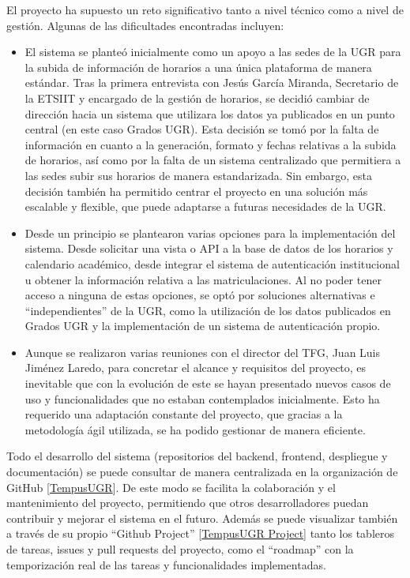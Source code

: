 El proyecto ha supuesto un reto significativo tanto a nivel técnico como a nivel de gestión. Algunas de las dificultades encontradas incluyen:
\begin{itemize}
    \item El sistema se planteó inicialmente como un apoyo a las sedes de la UGR para la subida de información de horarios a una única plataforma de manera estándar. Tras la primera entrevista con Jesús García Miranda, Secretario de la ETSIIT y encargado de la gestión de horarios, se decidió cambiar de dirección hacia un sistema que utilizara los datos ya publicados en un punto central (en este caso Grados UGR).
    Esta decisión se tomó por la falta de información en cuanto a la generación, formato y fechas relativas a la subida de horarios, así como por la falta de un sistema centralizado que permitiera a las sedes subir sus horarios de manera estandarizada.
    Sin embargo, esta decisión también ha permitido centrar el proyecto en una solución más escalable y flexible, que puede adaptarse a futuras necesidades de la UGR.

    \item Desde un principio se plantearon varias opciones para la implementación del sistema. Desde solicitar una vista o API a la base de datos de los horarios y calendario académico, desde integrar el sistema de autenticación institucional u obtener la información relativa a las matriculaciones. Al no poder tener acceso a ninguna de estas opciones, se optó por soluciones alternativas e ``independientes'' de la UGR, como la utilización de los datos publicados en Grados UGR y la implementación de un sistema de autenticación propio.
    \item Aunque se realizaron varias reuniones con el director del TFG, Juan Luis Jiménez Laredo, para concretar el alcance y requisitos del proyecto, es inevitable que con la evolución de este se hayan presentado nuevos casos de uso y funcionalidades que no estaban contemplados inicialmente. Esto ha requerido una adaptación constante del proyecto, que gracias a la metodología ágil utilizada, se ha podido gestionar de manera eficiente.
\end{itemize}

Todo el desarrollo del sistema (repositorios del backend, frontend, despliegue y documentación) se puede consultar de manera centralizada en la organización de GitHub [\href{https://github.com/TempusUGR}{TempusUGR}]. De este modo se facilita la colaboración y el mantenimiento del proyecto, permitiendo que otros desarrolladores puedan contribuir y mejorar el sistema en el futuro.
Además se puede visualizar también a través de su propio ``Github Project'' [\href{https://github.com/orgs/TempusUGR/projects/3}{TempusUGR Project}] tanto los tableros de tareas, issues y pull requests del proyecto, como el ``roadmap'' con la temporización real de las tareas y funcionalidades implementadas.

